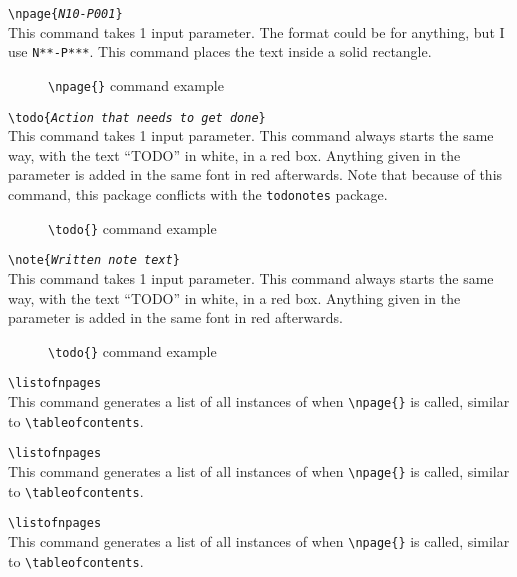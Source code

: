 \documentclass{article}
\begin{document}
\noindent \texttt{\textbackslash{}npage\{\textit{N10-P001}\}} \\
This command takes 1 input parameter. The format could be for anything, but I
use \texttt{N**-P***}. This command places the text inside a solid rectangle.
\begin{figure}[h!]
	\centering
	\caption{\texttt{\textbackslash{}npage\{\}} command example}
\end{figure}

\noindent \texttt{\textbackslash{}todo\{\textit{Action that needs to get done}\}} \\
This command takes 1 input parameter. This command always starts the same way, with the text ``TODO'' in white, in a red box. Anything given in the parameter is added in the same font in red afterwards. Note that because of this command, this package conflicts with the \texttt{todonotes} package.
\begin{figure}[h!]
	\centering
	\caption{\texttt{\textbackslash{}todo\{\}} command example}
\end{figure}

\noindent \texttt{\textbackslash{}note\{\textit{Written note text}\}} \\
This command takes 1 input parameter. This command always starts the same way, with the text ``TODO'' in white, in a red box. Anything given in the parameter is added in the same font in red afterwards.
\begin{figure}[h!]
	\centering
	\caption{\texttt{\textbackslash{}todo\{\}} command example}
\end{figure}

\noindent \texttt{\textbackslash{}listofnpages} \\
This command generates a list of all instances of when \texttt{\textbackslash{}npage\{\}} is called, similar to \texttt{\textbackslash{}tableofcontents}.
\vspace{1em}

\noindent \texttt{\textbackslash{}listofnpages} \\
This command generates a list of all instances of when \texttt{\textbackslash{}npage\{\}} is called, similar to \texttt{\textbackslash{}tableofcontents}.
\vspace{1em}

\noindent \texttt{\textbackslash{}listofnpages} \\
This command generates a list of all instances of when \texttt{\textbackslash{}npage\{\}} is called, similar to \texttt{\textbackslash{}tableofcontents}.
\vspace{1em}
\end{document}
